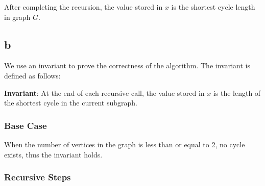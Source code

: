 \documentclass[12pt]{article}
\begin{document}
        After completing the recursion, the value stored in \(x\) is the shortest cycle length in graph \(G\).


    \subsection*{b}

        \hspace{1.5em}We use an invariant to prove the correctness of the algorithm. The invariant is defined as follows:

        \textbf{Invariant}: At the end of each recursive call, the value stored in \( x \) is the length of the shortest cycle in the current subgraph.

        \subsubsection*{Base Case}

        When the number of vertices in the graph is less than or equal to 2, no cycle exists, thus the invariant holds.

        \subsubsection*{Recursive Steps}
\end{document}
